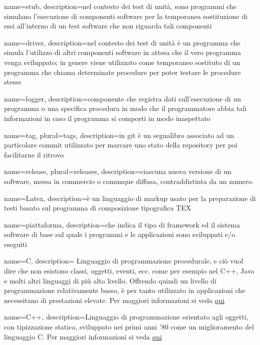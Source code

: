  {
	name=stub,
	description={nel contesto dei test di unità, sono programmi che simulano l'esecuzione di componenti software per la temporanea sostituzione di essi all'interno di un test software che non riguarda tali componenti}
}

 {
    name=driver,
    description={nel contesto dei test di unità è un programma che simula l'utilizzo di altri componenti software in attesa che il vero programma venga sviluppato; in genere viene utilizzato come temporaneo sostituto di un programma che chiama determinate procedure per poter testare le procedure stesse}
}

 {
    name=logger,
    description={componente che registra dati sull'esecuzione di un programma o una specifica procedura in modo che il programmatore abbia tali informazioni in caso il programma si comporti in modo inaspettato}
}

 {
    name=tag,
    plural=tags,
    description={in git è un segnalibro associato ad un particolare commit utilizzato per marcare uno stato della repository per poi facilitarne il ritrovo}
}

 {
    name=release,
    plural=releases,
    description={ciascuna nuova versione di un software, messa in commercio o comunque diffusa, contraddistinta da un numero}
}

 {
	name=Latex,
	description={è un linguaggio di markup usato per la preparazione di testi basato sul programma di composizione tipografica TEX}
}

 {
	name=piattaforma,
	description={che indica il tipo di framework ed il sistema software di base sul quale i programmi e le applicazioni sono sviluppati e/o eseguiti}
	}


 {
	name=C,
	description={ Linguaggio di programmazione procedurale, e ciò vuol dire che non esistono classi, oggetti, eventi, ecc. come per esempio nel C++, Java e molti altri linguaggi di più alto livello. Offrendo quindi un livello di programmazione relativamente basso, è per tanto utilizzato in applicazioni che necessitano di prestazioni elevate. Per maggiori informazioni si veda \href{https://it.wikiversity.org/wiki/Linguaggio_C}{qui} }
}

 {
	name=C++,
	description={Linguaggio di programmazione orientato agli oggetti, con tipizzazione statica, sviluppato nei primi anni '80 come un miglioramento del linguaggio C. Per maggiori informazioni si veda \href{https://it.wikiversity.org/wiki/C\%2B\%2B}{qui}}
}



